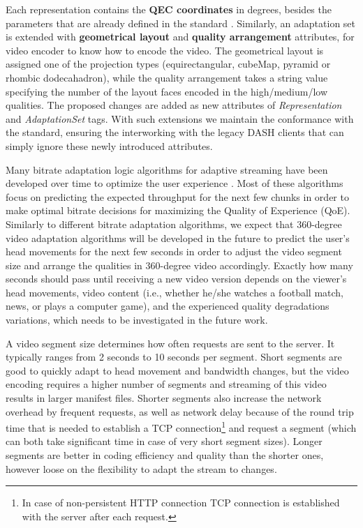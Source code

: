 Each representation contains the \textbf{QEC coordinates} in degrees, besides the parameters that are already defined in the standard \cite{}. Similarly, an adaptation set is extended with \textbf{geometrical layout} and \textbf{quality arrangement} attributes, for video encoder to know how to encode the video. The geometrical layout is assigned one of the projection types (equirectangular, cubeMap, pyramid or rhombic dodecahadron), while the quality arrangement takes a string value specifying the number of the layout faces encoded in the high/medium/low qualities. The proposed changes are added as new attributes of \textit{Representation} and \textit{AdaptationSet} tags. With such extensions we maintain the conformance with the standard, ensuring the interworking with the legacy DASH clients that can simply ignore these newly introduced attributes.


 Many bitrate adaptation logic algorithms for adaptive streaming have been developed over time to optimize the user experience \cite{}. Most of these algorithms focus on predicting the expected throughput for the next few chunks in order to make optimal bitrate decisions for maximizing the Quality of Experience (QoE). Similarly to different bitrate adaptation algorithms, we expect that 360-degree video adaptation algorithms will be developed in the future to predict the user's head movements for the next few seconds in order to adjust the video segment size and arrange the qualities in 360-degree video accordingly. Exactly how many seconds should pass until receiving a new video version depends on the viewer's head movements, video content (i.e., whether he/she watches a football match, news, or plays a computer game), and the experienced quality degradations variations, which needs to be investigated in the future work.%


 A video segment size determines how often requests are sent to the server. It typically ranges from 2 seconds to 10 seconds per segment. Short segments are good to quickly adapt to head movement and bandwidth changes, but the video encoding requires a higher number of segments and streaming of this video results in larger manifest files. Shorter segments also increase the network overhead by frequent requests, as well as network delay because of the round trip time that is needed to establish a TCP connection\footnote{In case of non-persistent HTTP connection TCP connection is established with the server after each request.} and request a segment (which can both take significant time in case of very short segment sizes). Longer segments are better in coding efficiency and quality than the shorter ones, however loose on the flexibility to adapt the stream to changes.

